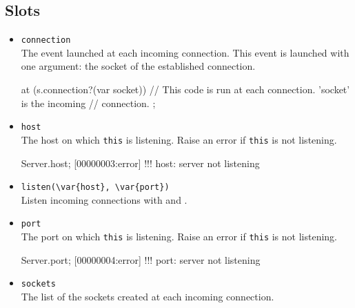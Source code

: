 \subsection{Slots}
\begin{itemize}
\item \lstinline|connection|\\
  The event launched at each incoming connection. This event is
  launched with one argument: the socket of the established connection.
\begin{urbiscript}
at (s.connection?(var socket))
{
  // This code is run at each connection. 'socket' is the incoming
  // connection.
};
\end{urbiscript}

\item \lstinline|host|\\
  The host on which \lstinline|this| is listening. Raise an error if
  \lstinline|this| is not listening.
\begin{urbiscript}
Server.host;
[00000003:error] !!! host: server not listening
\end{urbiscript}

\item \lstinline|listen(\var{host}, \var{port})|\\
  Listen incoming connections with  and .

\item \lstinline|port|\\
  The port on which \lstinline|this| is listening. Raise an error if
  \lstinline|this| is not listening.
\begin{urbiscript}
Server.port;
[00000004:error] !!! port: server not listening
\end{urbiscript}

\item \lstinline|sockets|\\
  The list of the sockets created at each incoming connection.
\end{itemize}

